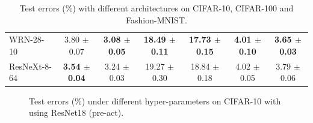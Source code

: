 \documentclass[10pt,twocolumn,letterpaper]{article}
\begin{document}
\begin{table}
\begin{center}
\begin{tabularx}{\linewidth}{ l|CC|CC|CC }
WRN-28-10 & 3.80 $\pm$ 0.07 &  \textbf{3.08  $\pm$ 0.05} & \textbf{18.49 $\pm$ 0.11} &  \textbf{17.73 $\pm$ 0.15} & \textbf{4.01 $\pm$ 0.10} &  \textbf{3.65 $\pm$ 0.03} \\
ResNeXt-8-64 & \textbf{3.54 $\pm$ 0.04} & 3.24 $\pm$ 0.03 &  19.27 $\pm$ 0.30 & 18.84 $\pm$ 0.18 & 4.02 $\pm$ 0.05 & 3.79 $\pm$ 0.06 \\
\hline
\end{tabularx}
\end{center}
\vspace{-.1in}
\caption{\label{tabel:classification result}Test errors (\%) with different architectures on CIFAR-10, CIFAR-100 and Fashion-MNIST.}
\end{table}


\begin{figure}[!t]
\centering
{}
\vspace{-.02in}
\caption{Test errors (\%) under different hyper-parameters on CIFAR-10 with using ResNet18 (pre-act).}
\label{fig:CIFAR-parameter}
\end{figure}
\end{document}
